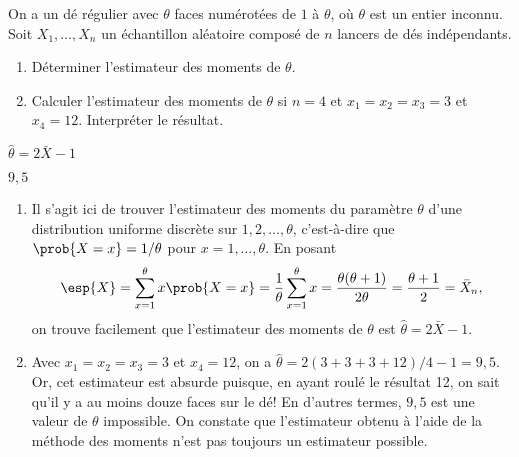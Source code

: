 \begin{exercice}
  On a un dé régulier avec $\theta$ faces numérotées de $1$ à
  $\theta$, où $\theta$ est un entier inconnu. Soit $X_1, \dots,
  X_n$ un échantillon aléatoire composé de $n$ lancers de dés indépendants.
  \begin{enumerate}
  \item Déterminer l'estimateur des moments de $\theta$.
  \item Calculer l'estimateur des moments de $\theta$ si $n = 4$ et
    $x_1 = x_2 = x_3 = 3$ et $x_4 = 12$. Interpréter le résultat.
  \end{enumerate}
  \begin{rep}
    \begin{inparaenum}
    \item $\hat{\theta} = 2 \bar{X} - 1$
    \item $9,5$
    \end{inparaenum}
  \end{rep}
  \begin{sol}
    \begin{enumerate}
    \item Il s'agit ici de trouver l'estimateur des moments du
      paramètre $\theta$ d'une distribution uniforme discrète sur $1,
      2, \dots, \theta$, c'est-à-dire que $\prob{X = x} = 1/\theta$
      pour $x = 1, \dots, \theta$. En posant
      \begin{align*}
        \esp{X} = \sum_{x=1}^{\theta} x \prob{X = x} = \frac{1}{\theta} \sum_{x = 1}^{\theta} x = \frac{\theta (\theta + 1)}{2 \theta} = \frac{\theta + 1}{2} = \bar{X}_n,
      \end{align*}
      on trouve facilement que l'estimateur des moments de $\theta$
      est $\hat{\theta} = 2 \bar{X} - 1$.
    \item Avec $x_1 = x_2 = x_3 = 3$ et $x_4 = 12$, on a $\hat{\theta}
      = 2 (3 + 3 + 3 + 12)/4 - 1 = 9,5$. Or, cet estimateur est
      absurde puisque, en ayant roulé le résultat 12, on sait qu'il y a au
      moins douze faces sur le dé! En d'autres termes, $9,5$ est
      une valeur de $\theta$ impossible. On constate que l'estimateur
      obtenu à l'aide de la méthode des moments n'est pas toujours un
      estimateur possible.
    \end{enumerate}
  \end{sol}
\end{exercice}



